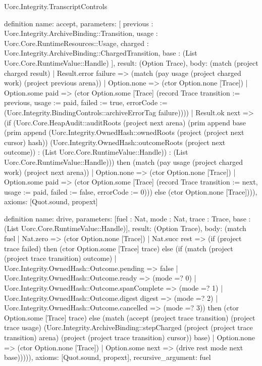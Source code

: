 \begin{lexlean}{Uorc.Integrity.TranscriptControls}
\begin{semanticmodule}
definition{
  name: accept,
  parameters: [
    previous : Uorc.Integrity.ArchiveBinding::Transition,
    usage : Uorc.Core.RuntimeResources::Usage,
    charged : Uorc.Integrity.ArchiveBinding::ChargedTransition,
    base : (List Uorc.Core.RuntimeValue::Handle)
  ],
  result: (Option Trace),
  body: (match (project charged result)
    | Result.error failure => (match (pay usage (project charged work) (project previous arena))
      | Option.none => (ctor Option.none [Trace])
      | Option.some paid => (ctor Option.some [Trace] (record Trace {transition := previous, usage := paid, failed := true, errorCode := (Uorc.Integrity.BindingControls::archiveErrorTag failure)})))
    | Result.ok next => (if (Uorc.Core.HeapAudit::auditRoots (project next arena) (prim append base (prim append (Uorc.Integrity.OwnedHash::ownedRoots (project (project next cursor) hash)) (Uorc.Integrity.OwnedHash::outcomeRoots (project next outcome)) : (List Uorc.Core.RuntimeValue::Handle)) : (List Uorc.Core.RuntimeValue::Handle))) then (match (pay usage (project charged work) (project next arena))
      | Option.none => (ctor Option.none [Trace])
      | Option.some paid => (ctor Option.some [Trace] (record Trace {transition := next, usage := paid, failed := false, errorCode := 0}))) else (ctor Option.none [Trace]))),
  axioms: [Quot.sound, propext]
}

definition{
  name: drive,
  parameters: [fuel : Nat, mode : Nat, trace : Trace, base : (List Uorc.Core.RuntimeValue::Handle)],
  result: (Option Trace),
  body: (match fuel
    | Nat.zero => (ctor Option.none [Trace])
    | Nat.succ rest => (if (project trace failed) then (ctor Option.some [Trace] trace) else (if (match (project (project trace transition) outcome)
      | Uorc.Integrity.OwnedHash::Outcome.pending => false
      | Uorc.Integrity.OwnedHash::Outcome.ready => (mode =? 0)
      | Uorc.Integrity.OwnedHash::Outcome.spanComplete => (mode =? 1)
      | Uorc.Integrity.OwnedHash::Outcome.digest digest => (mode =? 2)
      | Uorc.Integrity.OwnedHash::Outcome.cancelled => (mode =? 3)) then (ctor Option.some [Trace] trace) else (match (accept (project trace transition) (project trace usage) (Uorc.Integrity.ArchiveBinding::stepCharged (project (project trace transition) arena) (project (project trace transition) cursor)) base)
      | Option.none => (ctor Option.none [Trace])
      | Option.some next => (drive rest mode next base))))),
  axioms: [Quot.sound, propext],
  recursive_argument: fuel
}


\end{semanticmodule}
\end{lexlean}
